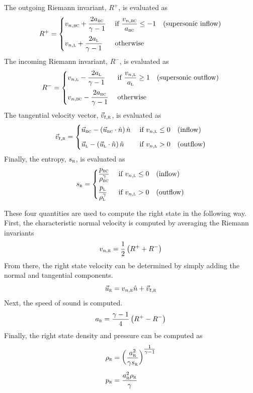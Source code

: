 
The outgoing Riemann invariant, $R^+$, is evaluated as
%
\[
  R^+ =
  \begin{cases}
    v_{n,\textsc{bc}} + \dfrac{2 a_{\textsc{bc}}}{\gamma-1} &
      \text{\;if } \dfrac{v_{n,\textsc{bc}}}{a_{\textsc{bc}}} \leq -1
    \quad \text{(supersonic inflow)} \\[2.5ex]
    v_{n,\textsc{l}} + \dfrac{2 a_{\textsc{l}}}{\gamma-1} &
      \text{\;otherwise}
  \end{cases}
\]
The incoming Riemann invariant, $R^-$, is evaluated as
%
\[
  R^- =
  \begin{cases}
    v_{n,\textsc{l}} - \dfrac{2 a_{\textsc{l}}}{\gamma-1} &
      \text{\;if } \dfrac{v_{n,\textsc{l}}}{a_{\textsc{l}}} \geq 1
    \quad \text{(supersonic outflow)} \\[2.5ex]
    v_{n,\textsc{bc}} - \dfrac{2 a_{\textsc{bc}}}{\gamma-1} &
      \text{\;otherwise}
  \end{cases}
\]
%
The tangential velocity vector, $\vec{v}_{t,\textsc{r}}$, is evaluated as
%
\[
  \vec{v}_{t,\textsc{r}} =
  \begin{cases}
    \vec{u}_{\textsc{bc}} - \left(\vec{u}_{\textsc{bc}}\cdot\hat{n}\right)\hat{n} &
      \text{\;if } v_{n,\textsc{l}} \leq 0 \quad \text{(inflow)} \\[1.5ex]
    \vec{u}_{\textsc{l}} - \left(\vec{u}_{\textsc{l}}\cdot\hat{n}\right)\hat{n} &
      \text{\;if } v_{n,\textsc{l}} > 0 \quad \text{(outflow)}
  \end{cases}
\]
%
Finally, the entropy, $s_{\textsc{r}}$, is evaluated as
\[
  s_{\textsc{r}} =
  \begin{cases}
    \dfrac{p_{\textsc{bc}}}{\rho^{\gamma}_{\textsc{bc}}} &
      \text{\;if } v_{n,\textsc{l}} \leq 0 \quad \text{(inflow)} \\[2.5ex]
    \dfrac{p_{\textsc{l}}}{\rho^{\gamma}_{\textsc{l}}} &
      \text{\;if } v_{n,\textsc{l}} > 0 \quad \text{(outflow)}
  \end{cases}
\]


These four quantities are used to compute the right state in the following way.
%
First, the characteristic normal velocity is computed by averaging the Riemann
invariants
%
\[
  v_{n,\textsc{r}} = \frac{1}{2}\left(R^+ + R^-\right)
\]
%
From there, the right state velocity can be determined by simply adding the
normal and tangential components.
%
\[
  \vec{u}_{\textsc{r}} = v_{n,\textsc{r}}\hat{n} + \vec{v}_{t,\textsc{r}}
\]
%
Next, the speed of sound is computed.
%
\[
  a_{\textsc{r}} = \frac{\gamma-1}{4} \left( R^+ - R^- \right)
\]
%
Finally, the right state density and pressure can be computed as
%
\begin{alignat*}{1}
  \rho_{\textsc{r}} &
      = \left(\frac{a^2_{\textsc{r}}}{\gamma s_{\textsc{r}}}\right)^{\tfrac{1}{\gamma-1}}
      \\[1.0ex]
  p_{\textsc{r}} &
      = \frac{a^2_{\textsc{r}} \rho_{\textsc{r}}}{\gamma}
\end{alignat*}

